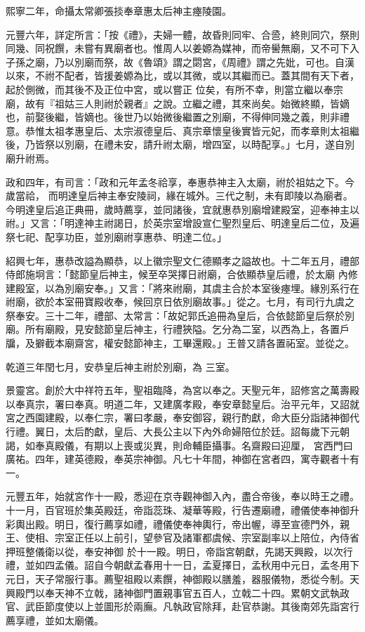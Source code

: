 \begin{pinyinscope}
 熙寧二年，命攝太常卿張掞奉章惠太后神主瘞陵園。



 元豐六年，詳定所言：「按《禮》，夫婦一體，故昏則同牢、合巹，終則同穴，祭則同幾、同祝饌，未嘗有異廟者也。惟周人以姜嫄為媒神，而帝嚳無廟，又不可下入子孫之廟，乃以別廟而祭，故《魯頌》謂之閟宮，《周禮》謂之先妣，可也。自漢以來，不祔不配者，皆援姜嫄為比，或以其微，或以其繼而已。蓋其間有天下者，起於側微，而其後不及正位中宮，或以嘗正
 位矣，有所不幸，則當立繼以奉宗廟，故有『祖姑三人則祔於親者』之說。立繼之禮，其來尚矣。始微終顯，皆嫡也，前娶後繼，皆嫡也。後世乃以始微後繼置之別廟，不得伸同幾之義，則非禮意。恭惟太祖孝惠皇后、太宗淑德皇后、真宗章懷皇後實皆元妃，而孝章則太祖繼後，乃皆祭以別廟，在禮未安，請升祔太廟，增四室，以時配享。」七月，遂自別廟升祔焉。



 政和四年，有司言：「政和元年孟冬祫享，奉惠恭神主入太廟，祔於祖姑之下。今歲當祫，
 而明達皇后神主奉安陵祠，緣在城外。三代之制，未有即陵以為廟者。今明達皇后追正典冊，歲時薦享，並同諸後，宜就惠恭別廟增建殿室，迎奉神主以祔。」又言：「明達神主祔謁日，於英宗室增設宣仁聖烈皇后、明達皇后二位，及遍祭七祀、配享功臣，並別廟祔享惠恭、明達二位。」



 紹興七年，惠恭改謚為顯恭，以上徽宗聖文仁德顯孝之謚故也。十二年五月，禮部侍郎施坰言：「懿節皇后神主，候至卒哭擇日祔廟，合依顯恭皇后禮，於太廟
 內修建殿室，以為別廟安奉。」又言：「將來祔廟，其虞主合於本室後瘞埋。緣別系行在祔廟，欲於本室冊寶殿收奉，候回京日依別廟故事。」從之。七月，有司行九虞之祭奉安。三十二年，禮部、太常言：「故妃郭氏追冊為皇后，合依懿節皇后祭於別廟。所有廟殿，見安懿節皇后神主，行禮狹隘。乞分為二室，以西為上，各置戶牖，及擗截本廟齋宮，權安懿節神主，工畢還殿。」王普又請各置祏室。並從之。



 乾道三年閏七月，安恭皇后神主祔於別廟，為
 三室。



 景靈宮。創於大中祥符五年，聖祖臨降，為宮以奉之。天聖元年，詔修宮之萬壽殿以奉真宗，署曰奉真。明道二年，又建廣孝殿，奉安章懿皇后。治平元年，又詔就宮之西園建殿，以奉仁宗，署曰孝嚴，奉安御容，親行酌獻，命大臣分詣諸神御代行禮。翼日，太后酌獻，皇后、大長公主以下內外命婦陪位於廷。詔每歲下元朝謁，如奉真殿儀，有期以上喪或災異，則命輔臣攝事。名齋殿曰迎厘，
 宮西門曰廣祐。四年，建英德殿，奉英宗神御。凡七十年間，神御在宮者四，寓寺觀者十有一。



 元豐五年，始就宮作十一殿，悉迎在京寺觀神御入內，盡合帝後，奉以時王之禮。十一月，百官班於集英殿廷，帝詣蕊珠、凝華等殿，行告遷廟禮，禮儀使奉神御升彩輿出殿。明日，復行薦享如禮，禮儀使奉神輿行，帝出幄，導至宣德門外，親王、使相、宗室正任以上前引，望參官及諸軍都虞候、宗室副率以上陪位，內侍省押班整儀衛以從，奉安神御
 於十一殿。明日，帝詣宮朝獻，先謁天興殿，以次行禮，並如四孟儀。詔自今朝獻孟春用十一日，孟夏擇日，孟秋用中元日，孟冬用下元日，天子常服行事。薦聖祖殿以素饌，神御殿以膳羞，器服儀物，悉從今制。天興殿門以奉天神不立戟，諸神御門置親事官五百人，立戟二十四。累朝文武執政官、武臣節度使以上並圖形於兩廡。凡執政官除拜，赴官恭謝。其後南郊先詣宮行薦享禮，並如太廟儀。




\end{pinyinscope}
